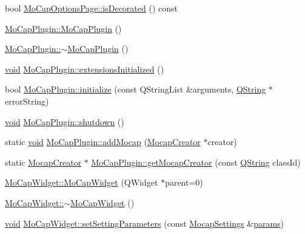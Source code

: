 \begin{DoxyCompactItemize}
bool \hyperlink{group___mo_cap_plugin_gaea29fdd6e8a640f92167d6a581d23eac}{Mo\-Cap\-Options\-Page\-::is\-Decorated} () const 
\item 
\hyperlink{group___mo_cap_plugin_gae4dfd9a9bb3746b1311deb0968382442}{Mo\-Cap\-Plugin\-::\-Mo\-Cap\-Plugin} ()
\item 
\hyperlink{group___mo_cap_plugin_gae35a57590fd1156a31b514641702fb0e}{Mo\-Cap\-Plugin\-::$\sim$\-Mo\-Cap\-Plugin} ()
\item 
\hyperlink{group___u_a_v_objects_plugin_ga444cf2ff3f0ecbe028adce838d373f5c}{void} \hyperlink{group___mo_cap_plugin_ga44d4c75032b9cb5698f876ff3cee5e09}{Mo\-Cap\-Plugin\-::extensions\-Initialized} ()
\item 
bool \hyperlink{group___mo_cap_plugin_ga91a5975a6eb4f0771b265669e68b9732}{Mo\-Cap\-Plugin\-::initialize} (const Q\-String\-List \&arguments, \hyperlink{group___u_a_v_objects_plugin_gab9d252f49c333c94a72f97ce3105a32d}{Q\-String} $\ast$error\-String)
\item 
\hyperlink{group___u_a_v_objects_plugin_ga444cf2ff3f0ecbe028adce838d373f5c}{void} \hyperlink{group___mo_cap_plugin_ga6ceccf865e672ec6799046772bb33346}{Mo\-Cap\-Plugin\-::shutdown} ()
\item 
static \hyperlink{group___u_a_v_objects_plugin_ga444cf2ff3f0ecbe028adce838d373f5c}{void} \hyperlink{group___mo_cap_plugin_ga6af38b170105a0cbf49fcd99f3765f76}{Mo\-Cap\-Plugin\-::add\-Mocap} (\hyperlink{class_mocap_creator}{Mocap\-Creator} $\ast$creator)
\item 
static \hyperlink{class_mocap_creator}{Mocap\-Creator} $\ast$ \hyperlink{group___mo_cap_plugin_ga1d86e516f13c5ef45cf76400e74fe8e5}{Mo\-Cap\-Plugin\-::get\-Mocap\-Creator} (const \hyperlink{group___u_a_v_objects_plugin_gab9d252f49c333c94a72f97ce3105a32d}{Q\-String} class\-Id)
\item 
\hyperlink{group___mo_cap_plugin_ga36cbb83db56d6d7eb8f5d30717d2c5e4}{Mo\-Cap\-Widget\-::\-Mo\-Cap\-Widget} (Q\-Widget $\ast$parent=0)
\item 
\hyperlink{group___mo_cap_plugin_gae095eb46b9b054f9601f677e9d82ad49}{Mo\-Cap\-Widget\-::$\sim$\-Mo\-Cap\-Widget} ()
\item 
\hyperlink{group___u_a_v_objects_plugin_ga444cf2ff3f0ecbe028adce838d373f5c}{void} \hyperlink{group___mo_cap_plugin_ga49fc96a517fa87b95341072a5bacd7f9}{Mo\-Cap\-Widget\-::set\-Setting\-Parameters} (const \hyperlink{group___mo_cap_plugin_ga6083347a5b3eb70e360f599354dc0f0b}{Mocap\-Settings} \&\hyperlink{glext_8h_afeb6390ab3bc8a0e96a88aff34d52288}{params})
\end{DoxyCompactItemize}
